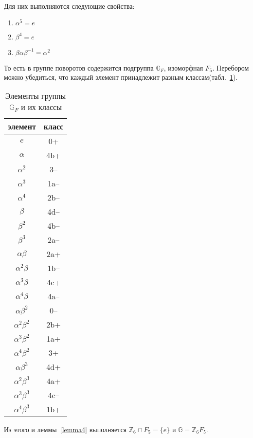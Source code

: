 \documentclass[utf8,a4paper,draft]{article}
\newtheorem{lemma_cub}{Лемма}[section]
\begin{document}
Для них выполняются следующие свойства:
\begin{enumerate}
\item $\alpha^5=e$
\item $\beta^4=e$
\item $\beta\alpha\beta^{-1}=\alpha^2$
\end{enumerate}
То есть в группе поворотов содержится подгруппа $\mathbb{G}_F$, изоморфная $F_5$. Перебором можно убедиться, что каждый элемент принадлежит разным классам(табл.~\ref{elt}).
\begin{table}[h]
\begin{center}
  \begin{tabular}{| c | c |}
    \hline
    элемент & класс\\\hline
        $e$ & 0+  \\\hline
        $\alpha$ & 4b+ \\\hline
      $\alpha^2$ & 3-- \\\hline
      $\alpha^3$ & 1a--\\\hline
      $\alpha^4$ & 2b--\\\hline
        $\beta$ & 4d--\\\hline
      $\beta^2$ & 4b--\\\hline
      $\beta^3$ & 2a--\\\hline
       $\alpha\beta$ & 2a+ \\\hline
     $\alpha^2\beta$ & 1b--\\\hline
     $\alpha^3\beta$ & 4c+ \\\hline
     $\alpha^4\beta$ & 4a--\\\hline
     $\alpha\beta^2$ & 0-- \\\hline
   $\alpha^2\beta^2$ & 2b+ \\\hline
   $\alpha^3\beta^2$ & 1a+ \\\hline
   $\alpha^4\beta^2$ & 3+  \\\hline
     $\alpha\beta^3$ & 4d+ \\\hline
   $\alpha^2\beta^3$ & 4a+ \\\hline
   $\alpha^3\beta^3$ & 4c--\\\hline
   $\alpha^4\beta^3$ & 1b+ \\\hline
  \end{tabular}
  \end{center}
  \caption{Элементы группы $\mathbb{G}_F$ и их классы\label{elt}}
\end{table}
Из этого и леммы~\ref{lemma4} выполняется $\mathbb{Z}_6\cap F_5=\{e\}$ и $\mathbb{G}=\mathbb{Z}_6F_5$.
\end{document}
